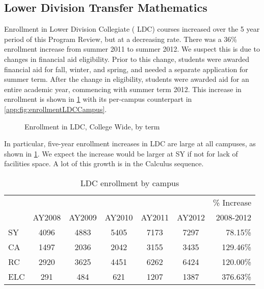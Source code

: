 \subsection{Lower Division Transfer Mathematics}
Enrollment in Lower Division Collegiate ( LDC) courses increased over the 5
year period of this Program Review, but at a decreasing rate. There was a 36\%
enrollment increase from summer 2011 to summer 2012. We suspect this is due to
changes in financial aid eligibility. Prior to this change, students were
awarded financial aid for fall, winter, and spring, and needed a separate
application for summer term.  After the change in eligibility, students were
awarded aid for an entire academic year, commencing with summer term 2012.
This increase in enrollment is shown in \cref{needs:fig:enrollmentLDCTerm} with
its per-campus counterpart in \vref{app:fig:enrollmentLDCCampus}.

\begin{figure}[!htb]
	\centering
	
	\caption{Enrollment in LDC, College Wide, by term}
	\label{needs:fig:enrollmentLDCTerm}
\end{figure}

In particular, five-year enrollment increases  in LDC are large at all
campuses, as shown in \cref{needs:tab:LDCenrollmentCampus}.  We expect the
increase would be larger at SY if not for lack of facilities space. A lot of
this growth is in the Calculus sequence.   

\begin{table}[!htb]
	\centering
	\caption{LDC enrollment by campus}
	\label{needs:tab:LDCenrollmentCampus}
	\begin{tabular}{l*{5}{c}r}
		\toprule
		    &        &        &        &        &        & \% Increase \\
		    & AY2008 & AY2009 & AY2010 & AY2011 & AY2012 & 2008-2012   \\
		\midrule
		SY  & 4096   & 4883   & 5405   & 7173   & 7297   & 78.15\%     \\
		CA  & 1497   & 2036   & 2042   & 3155   & 3435   & 129.46\%    \\
		RC  & 2920   & 3625   & 4451   & 6262   & 6424   & 120.00\%    \\
		ELC & 291    & 484    & 621    & 1207   & 1387   & 376.63\%    \\
		\bottomrule
	\end{tabular}
\end{table}


